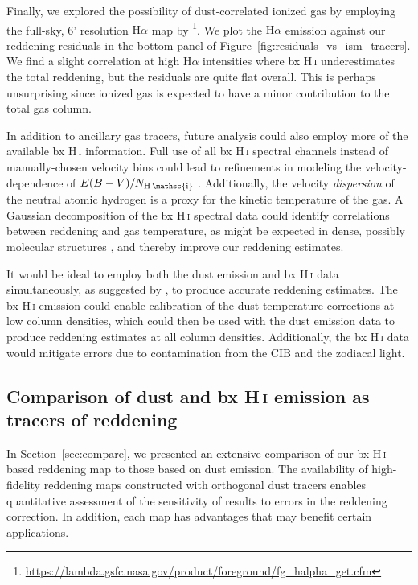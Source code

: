 \documentclass[iop,apj]{emulateapj}
\makeatletter
\def\testbx{bx}%
\DeclareRobustCommand{\ion}[2]{%
\relax\ifmmode
\ifx\testbx\f@series
{\mathbf{#1\,\mathsc{#2}}}\else
{\mathrm{#1\,\mathsc{#2}}}\fi
\else\textup{#1\,{\mdseries\textsc{#2}}}%
\fi}
\makeatother
\begin{document}
Finally, we explored the possibility of dust-correlated ionized gas by employing the full-sky, 6' resolution $\mathrm{H}\alpha$ map by \citet{Finkbeiner_2003}\footnote{\url{https://lambda.gsfc.nasa.gov/product/foreground/fg\_halpha\_get.cfm}}. We plot the $\mathrm{H}\alpha$ emission against our reddening residuals in the bottom panel of Figure~\ref{fig:residuals_vs_ism_tracers}. We find a slight correlation at high H$\alpha$ intensities where \ion{H}{i} underestimates the total reddening, but the residuals are quite flat overall. This is perhaps unsurprising since ionized gas is expected to have a minor contribution to the total gas column.

In addition to ancillary gas tracers, future analysis could also employ more of the available \ion{H}{i} information. Full use of all \ion{H}{i} spectral channels instead of manually-chosen velocity bins could lead to refinements in modeling the velocity-dependence of $E(B-V)/N_{\ion{H}{i}}$ \citep[see][]{Lenz+etal_2016}. Additionally, the velocity {\it dispersion} of the neutral atomic hydrogen is a proxy for the kinetic temperature of the gas. A Gaussian decomposition of the \ion{H}{i} spectral data could identify correlations between reddening and gas temperature, as might be expected in dense, possibly molecular structures \citep{Haud_2010, Roehser+etal_2016}, and thereby improve our reddening estimates.

It would be ideal to employ both the dust emission and \ion{H}{i} data simultaneously, as suggested by \citet{Peek_2013}, to produce accurate reddening estimates. The \ion{H}{i} emission could enable calibration of the dust temperature corrections at low column densities, which could then be used with the dust emission data to produce reddening estimates at all column densities. Additionally, the \ion{H}{i} data would mitigate errors due to contamination from the CIB and the zodiacal light. 

\subsection{Comparison of dust and \ion{H}{i} emission as tracers of reddening}

In Section~\ref{sec:compare}, we presented an extensive comparison of our \ion{H}{i}-based reddening map to those based on dust emission. The availability of high-fidelity reddening maps constructed with orthogonal dust tracers enables quantitative assessment of the sensitivity of results to errors in the reddening correction. In addition, each map has advantages that may benefit certain applications.
\end{document}
